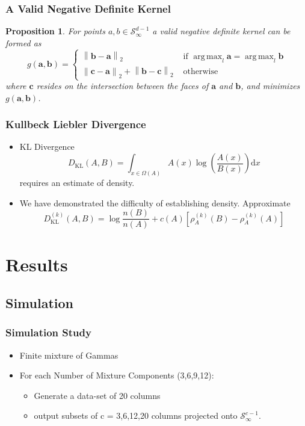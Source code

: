 \documentclass[aspectratio=169]{beamer}
\newcommand{\norm}[1]{\left\lVert #1 \right\rVert}
\newcommand{\pnorm}[2]{\norm{#1}_{#2}}
\newtheorem{prop}{Proposition}
\DeclareMathOperator*{\argmax}{arg\,max}
\begin{document}
\begin{frame}
  \frametitle{A Valid Negative Definite Kernel}
  \begin{prop}
    For points $a,b \in \mathcal{S}_{\infty}^{d-1}$ a valid negative definite kernel can be formed as
    \begin{equation*}
      g(\bm{a},\bm{b}) = \begin{cases}
        \pnorm{\bm{b}-\bm{a}}{2} &\text{ if }\argmax_l\bm{a} = \argmax_l\bm{b}\\
        \pnorm{\bm{c}-\bm{a}}{2} + \pnorm{\bm{b}-\bm{c}}{2} &\text{ otherwise}
      \end{cases}
    \end{equation*}
    where $\bm{c}$ resides on the intersection between the faces of $\bm{a}$ and $\bm{b}$, and
                minimizes $g(\bm{a},\bm{b})$.
  \end{prop}
\end{frame}

\begin{frame}
  \frametitle{Kullbeck Liebler Divergence}
  \begin{itemize}
    \item KL Divergence
      \begin{equation*}
        D_{\text{KL}}(A,B) = \int_{x\in \Omega(A)}A(x)\log\left(\frac{A(x)}{B(x)}\right)\text{d}x
      \end{equation*}
      requires an estimate of density.
    \pause
    \item We have demonstrated the difficulty of establishing density.  Approximate
      \begin{equation*}
      D_{\text{KL}}^{(k)}(A,B) = \log\frac{n(B)}{n(A)} + c(A) \left[\rho_A^{(k)}(B)
                                                      - \rho_A^{(k)}(A)\right]
      \end{equation*}

  \end{itemize}
\end{frame}


\section{Results}

\subsection{Simulation}

\begin{frame}
  \frametitle{Simulation Study}
  \begin{itemize}
    \item Finite mixture of Gammas
    \item For each Number of Mixture Components (3,6,9,12):
      \begin{itemize}
        \item Generate a data-set of 20 columns
        \item output subsets of c = 3,6,12,20 columns projected onto $\mathcal{S}_{\infty}^{c-1}$.
      \end{itemize}
  \end{itemize}
\end{frame}
\end{document}
